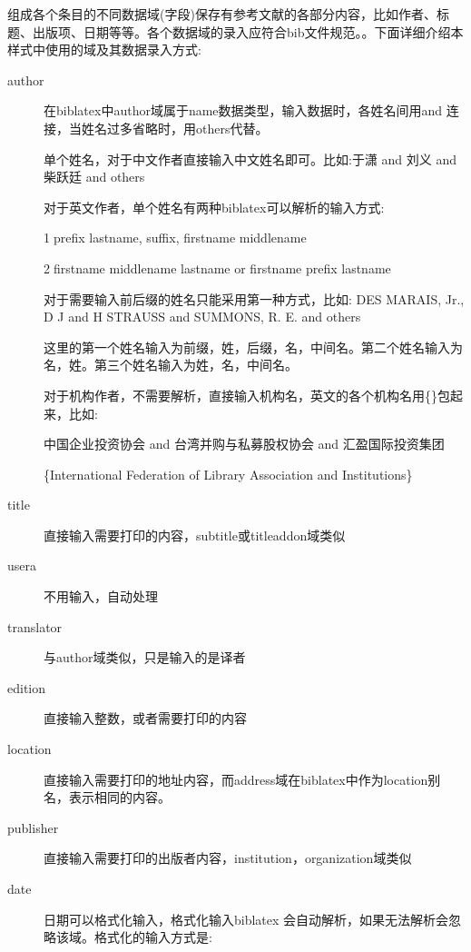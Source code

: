 组成各个条目的不同数据域(字段)保存有参考文献的各部分内容，比如作者、标题、出版项、日期等等。各个数据域的录入应符合bib文件规范。。下面详细介绍本样式中使用的域及其数据录入方式:

\begin{description}
  \item[author] 在biblatex中author域属于name数据类型，输入数据时，各姓名间用and 连接，当姓名过多省略时，用others代替。

      单个姓名，对于中文作者直接输入中文姓名即可。比如:于潇 and 刘义 and 柴跃廷 and others

      对于英文作者，单个姓名有两种biblatex可以解析的输入方式:

      \textcircled{1}prefix lastname, suffix, firstname middlename

      \textcircled{2}firstname middlename lastname or firstname prefix lastname

      对于需要输入前后缀的姓名只能采用第一种方式，比如:
      DES MARAIS, Jr., D J and H STRAUSS and SUMMONS, R. E. and others

      这里的第一个姓名输入为前缀，姓，后缀，名，中间名。第二个姓名输入为名，姓。第三个姓名输入为姓，名，中间名。


      对于机构作者，不需要解析，直接输入机构名，英文的各个机构名用\{\}包起来，比如:

      中国企业投资协会 and 台湾并购与私募股权协会 and 汇盈国际投资集团

      \{International Federation of Library Association and Institutions\}

  \item[title] 直接输入需要打印的内容，subtitle或titleaddon域类似
  \item[usera] 不用输入，自动处理
  \item[translator] 与author域类似，只是输入的是译者
  \item[edition] 直接输入整数，或者需要打印的内容
  \item[location] 直接输入需要打印的地址内容，而address域在biblatex中作为location别名，表示相同的内容。
  \item[publisher] 直接输入需要打印的出版者内容，institution，organization域类似
  \item[date] 日期可以格式化输入，格式化输入biblatex 会自动解析，如果无法解析会忽略该域。格式化的输入方式是:


\end{description}
